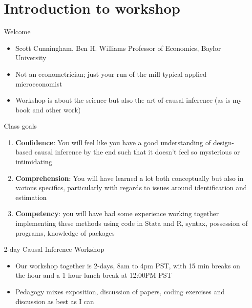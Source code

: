 \documentclass{beamer}
\begin{document}




\section{Introduction to workshop}

\begin{frame}{Welcome}

  \begin{itemize}
    \item Scott Cunningham, Ben H. Williams Professor of Economics, Baylor University 
    \item Not an econometrician; just your run of the mill typical applied microeconomist
    \item Workshop is about the science but also the art of causal inference (as is my book and other work)
  \end{itemize}

\end{frame}


\begin{frame}{Class goals}

  \begin{enumerate}
    \item \textbf{Confidence}: You will feel like you have a good understanding of design-based causal inference by the end such that it doesn't feel so mysterious or intimidating
    \item \textbf{Comprehension}: You will have learned a lot both conceptually but also in various specifics, particularly with regards to issues around identification and estimation
    \item \textbf{Competency}: you will have had some experience working together implementing these methods using code in Stata and R, syntax, possession of programs, knowledge of packages
  \end{enumerate}

\end{frame}

\begin{frame}{2-day Causal Inference Workshop}

  \begin{itemize}
    \item Our workshop together is 2-days, 8am to 4pm PST, with 15 min breaks on the hour and a 1-hour lunch break at 12:00PM PST
    \item Pedagogy mixes exposition, discussion of papers, coding exercises and discussion as best as I can
  \end{itemize}

\end{frame}
\end{document}
